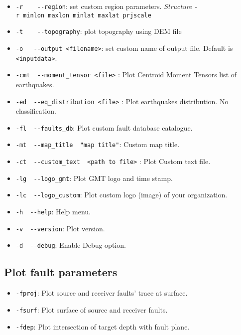 \begin{itemize}
\item
  \texttt{-r\ \ \ \textbar{}\ -\/-region}: set custom region parameters.
  \emph{Structure} \texttt{-r\ minlon\ maxlon\ minlat\ maxlat\ prjscale}
\item
  \texttt{-t\ \ \ \textbar{}\ -\/-topography}: plot topography using DEM
  file
\item
  \texttt{-o\ \ \textbar{}\ -\/-output\ \textless{}filename\textgreater{}}:
  set custom name of output file. Default is
  \texttt{\textless{}inputdata\textgreater{}}.
\item
  \texttt{-cmt\ \textbar{}\ -\/-moment\_tensor\ \textless{}file\textgreater{}}
  : Plot Centroid Moment Tensors list of earthquakes.
\item
  \texttt{-ed\ \textbar{}\ -\/-eq\_distribution\ \textless{}file\textgreater{}}
  : Plot earthquakes distribution. No classification.
\item
  \texttt{-fl\ \textbar{}\ -\/-faults\_db}: Plot custom fault database
  catalogue.
\item
  \texttt{-mt\ \textbar{}\ -\/-map\_title\ \ "map\ title"}: Custom map
  title.
\item
  \texttt{-ct\ \textbar{}\ -\/-custom\_text\ \ \textless{}path\ to\ file\textgreater{}}
  : Plot Custom text file.
\item
  \texttt{-lg\ \textbar{}\ -\/-logo\_gmt}: Plot GMT logo and time stamp.
\item
  \texttt{-lc\ \textbar{}\ -\/-logo\_custom}: Plot custom logo (image)
  of your organization.
\item
  \texttt{-h\ \textbar{}\ -\/-help}: Help menu.
\item
  \texttt{-v\ \textbar{}\ -\/-version}: Plot version.
\item
  \texttt{-d\ \textbar{}\ -\/-debug}: Enable Debug option.
\end{itemize}

\subsection{Plot fault parameters}\label{plot-fault-parameters}

\begin{itemize}
\item
  \texttt{-fproj}: Plot source and receiver faults' trace at surface.
\item
  \texttt{-fsurf}: Plot surface of source and receiver faults.
\item
  \texttt{-fdep}: Plot intersection of target depth with fault plane.
\end{itemize}

